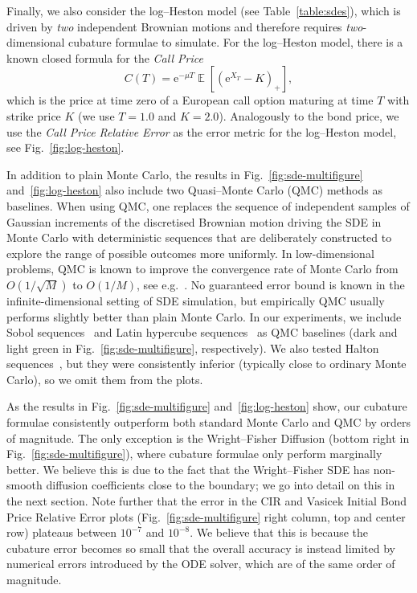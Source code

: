 \documentclass[11pt, letterpaper]{article}
\theoremstyle{definition}
\theoremstyle{remark}
\DeclareMathOperator{\E}{\mathbb{E}}
\newcommand{\e}{\mathrm{e}}
\begin{document}
Finally, we also consider the log--Heston model (see Table~\ref{table:sdes}), which is driven by \emph{two} independent Brownian motions and therefore requires \emph{two}-dimensional cubature formulae to simulate. For the log--Heston model, there is a known closed formula for the \emph{Call Price}
\begin{equation}\label{eq:loghestoncallprice}
    C(T) = \e^{-\mu T} \E\left[ \left( \e^{X_T} - K\right)_+\right],
\end{equation}
which is the price at time zero of a European call option maturing at time $T$ with strike price $K$ (we use $T = 1.0$ and $K = 2.0$). Analogously to the bond price, we use the \emph{Call Price Relative Error} as the error metric for the log--Heston model, see Fig.~\ref{fig:log-heston}.

In addition to plain Monte Carlo, the results in Fig.~\ref{fig:sde-multifigure} and~\ref{fig:log-heston} also include two Quasi--Monte Carlo (QMC) methods as baselines. When using QMC, one replaces the sequence of independent samples of Gaussian increments of the discretised Brownian motion driving the SDE in Monte Carlo with deterministic sequences that are deliberately constructed to explore the range of possible outcomes more uniformly. In low-dimensional problems, QMC is known to improve the convergence rate of Monte Carlo from $O(1 / \sqrt{M})$ to $O(1 / M)$, see e.g.~\cite{wangqmc,niederreiterqmc}. No guaranteed error bound is known in the infinite-dimensional setting of SDE simulation, but empirically QMC usually performs slightly better than plain Monte Carlo.  In our experiments, we include Sobol sequences~\cite{sobol} and Latin hypercube sequences~\cite{latin} as QMC baselines (dark and light green in Fig.~\ref{fig:sde-multifigure}, respectively). We also tested Halton sequences~\cite{halton}, but they were consistently inferior (typically close to ordinary Monte Carlo), so we omit them from the plots.

As the results in Fig.~\ref{fig:sde-multifigure} and~\ref{fig:log-heston} show, our cubature formulae consistently outperform both standard Monte Carlo and QMC by orders of magnitude. The only exception is the Wright--Fisher Diffusion (bottom right in Fig.~\ref{fig:sde-multifigure}), where cubature formulae only perform marginally better. We believe this is due to the fact that the Wright--Fisher SDE has non-smooth diffusion coefficients close to the boundary; we go into detail on this in the next section.
Note further that the error in the CIR and Vasicek Initial Bond Price Relative Error plots (Fig.~\ref{fig:sde-multifigure} right column, top and center row) plateaus between $10^{-7}$ and $10^{-8}$.
We believe that this is because the cubature error becomes so small that the overall accuracy is instead limited by numerical errors introduced by the ODE solver, which are of the same order of magnitude.
\end{document}
